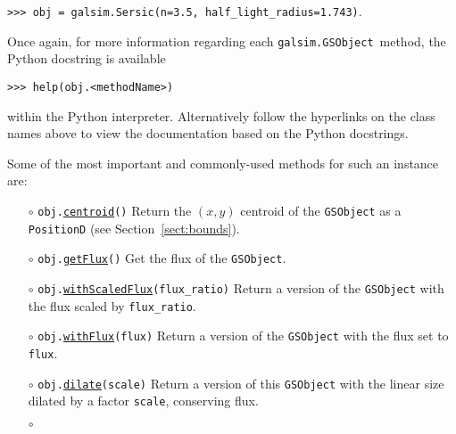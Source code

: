 \documentclass[preprint,10pt]{../../devel/modules/aastex}
\begin{document}
\texttt{>>> obj = galsim.Sersic(n=3.5, half\_light\_radius=1.743)}.

Once again, for more information regarding each \texttt{galsim.GSObject}~method,
the Python docstring is available

\texttt{>>> help(obj.<methodName>)}

within the Python interpreter.  Alternatively follow the hyperlinks on
the class names above to view the documentation based
on the Python docstrings.

Some of the most important and commonly-used methods for such an
instance are:
\begin{itemize}
  \item[$\circ$]
  \texttt{obj.}\href{http://galsim-developers.github.io/GalSim/classgalsim_1_1base_1_1_g_s_object.html#a08a0bb72927fce3c765a9580de656d1a}{\texttt{centroid}}\texttt{()}
    \newline
    Return the $(x, y)$ centroid of the \texttt{GSObject} as a
    \texttt{PositionD} (see Section~\ref{sect:bounds}).
  \item[$\circ$]
  \texttt{obj.}\href{http://galsim-developers.github.io/GalSim/classgalsim_1_1base_1_1_g_s_object.html#a662d8ce421ecd90080bdcaaf6890aed8}{\texttt{getFlux}}\texttt{()}
    \newline
    Get the flux of the \texttt{GSObject}.
  \item[$\circ$]
  \texttt{obj.}\href{http://galsim-developers.github.io/GalSim/classgalsim_1_1base_1_1_g_s_object.html#a21a5b330e1c7565a2bb56258127d6149}{\texttt{withScaledFlux}}\texttt{(flux\_ratio)}
    \newline
    Return a version of the \texttt{GSObject} with the flux scaled by \texttt{flux\_ratio}.
  \item[$\circ$]
  \texttt{obj.}\href{http://galsim-developers.github.io/GalSim/classgalsim_1_1base_1_1_g_s_object.html#a3f12b6158381ca5ef6da8e94f701f3e5}{\texttt{withFlux}}\texttt{(flux)}
    \newline
    Return a version of the \texttt{GSObject} with the flux set to \texttt{flux}.
  \item[$\circ$]
  \texttt{obj.}\href{http://galsim-developers.github.io/GalSim/classgalsim_1_1base_1_1_g_s_object.html#a0e80b6924c48e9708dd9e475f3b48b5f}{\texttt{dilate}}\texttt{(scale)}
    \newline
    Return a version of this \texttt{GSObject} with the linear size dilated by a
    factor \texttt{scale}, conserving flux.
  \item[$\circ$]

\end{itemize}
\end{document}
